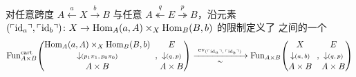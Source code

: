 \begin{theorem}[\trYonedaLemma]\label{thm:two-sided-yoneda-lemma}
对任意跨度 $A\overset{a}{\leftarrow}X\overset{b}{\rightarrow}B$ 与任意%
\trTwoSidedFibration{}
$A\overset{q}{\twoheadleftarrow}E\overset{p}{\twoheadrightarrow}B$，沿元素
$(\ulcorner\mathrm{id}_{a}\urcorner,\ulcorner\mathrm{id}_{b}\urcorner)\colon X\to\mathrm{Hom}_{A}(a,A)\times_{X}\mathrm{Hom}_{B}(B,b)$ 的限制定义了%
\trQuasiCategory{}之间的一个\trEquivalence
{\small\[
\mathrm{Fun}_{A\times B}^{\mathrm{cart}}\!\left(
\begin{gathered}
\mathrm{Hom}_{A}(a,A)\times_{X}\mathrm{Hom}_{B}(B,b)\\[-2pt]
\downarrow\scriptstyle (p_{1}\pi_{1},\,p_{0}\pi_{0})\\[-2pt]
A\times B
\end{gathered}
\;\right.,
\left.
\begin{gathered}
E\\[-2pt]
\downarrow\scriptstyle (q,\,p)\\[-2pt]
A\times B
\end{gathered}
\right)
\xrightarrow[\ \sim\ ]{\ \mathrm{ev}_{(\qcor{\mathrm{id}_{a}},\,\qcor{\mathrm{id}_{b}})}\ }
\mathrm{Fun}_{A\times B}\!\left(
\begin{gathered}
X\\[-2pt]
\downarrow\scriptstyle (a,\,b)\\[-2pt]
A\times B
\end{gathered}
\;\right.,
\left.
\begin{gathered}
E\\[-2pt]
\downarrow\scriptstyle (q,\,p)\\[-2pt]
A\times B
\end{gathered}
\right)
\]}
\end{theorem}

